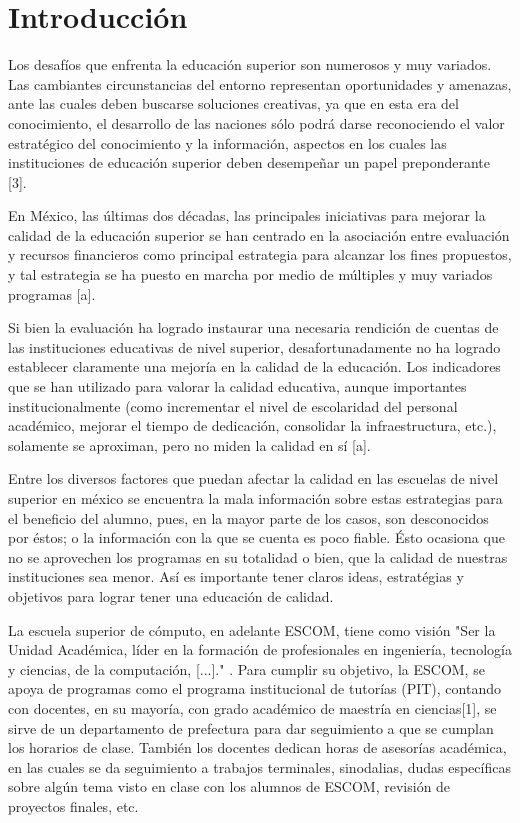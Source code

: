 \section{Introducción}

Los desafíos que enfrenta la educación superior son numerosos y muy variados. Las cambiantes circunstancias del entorno representan oportunidades y amenazas, ante las cuales deben buscarse soluciones creativas, ya que en esta era del conocimiento, el desarrollo de las naciones sólo podrá darse reconociendo el valor estratégico del conocimiento y la información, aspectos en los cuales las instituciones de educación superior deben desempeñar un papel preponderante [3].

En México, las últimas dos décadas, las principales iniciativas para mejorar la calidad de la educación superior se han centrado en la asociación entre evaluación y recursos financieros como principal estrategia para alcanzar los fines propuestos, y tal estrategia se ha puesto en marcha por medio de múltiples y muy variados programas [a].

Si bien la evaluación ha logrado instaurar una necesaria rendición de cuentas de las instituciones educativas de nivel superior, desafortunadamente no ha logrado establecer claramente una mejoría en la calidad de la educación. Los indicadores que se han utilizado para valorar la calidad educativa, aunque importantes institucionalmente (como incrementar el nivel de escolaridad del personal académico, mejorar el tiempo de dedicación, consolidar la infraestructura, etc.), solamente se aproximan, pero no miden la calidad en sí [a].

Entre los diversos factores que puedan afectar la calidad en las escuelas de nivel superior en méxico se encuentra la mala información sobre estas estrategias para el beneficio del alumno, pues, en la mayor parte de los casos, son desconocidos por éstos; o la información con la que se cuenta es poco fiable. Ésto ocasiona que no se aprovechen los programas en su totalidad o bien, que la calidad de nuestras instituciones sea menor. Así es importante tener claros ideas, estratégias y objetivos para lograr tener una educación de calidad.  

La escuela superior de cómputo, en adelante ESCOM,  tiene como visión "Ser la Unidad Académica, líder en la formación de profesionales en ingeniería, tecnología y ciencias, de la computación, [...]." \cite{ESCOM}. Para cumplir su objetivo, la ESCOM,  se apoya de programas como el programa institucional de tutorías (PIT), contando con docentes, en su mayoría, con grado académico de maestría en ciencias[1], se sirve de un departamento de prefectura para dar seguimiento a que se cumplan los horarios de clase. También los docentes dedican horas de asesorías académica, en las cuales se da seguimiento a trabajos terminales, sinodalias, dudas específicas sobre algún tema visto en clase con los alumnos de ESCOM, revisión de proyectos finales, etc. 

